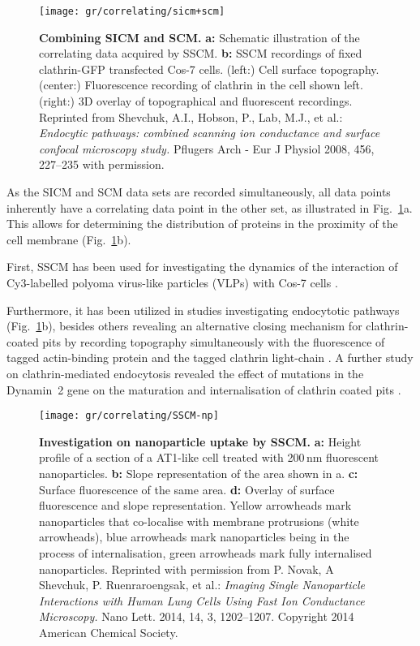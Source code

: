 \begin{figure}
  \texttt{[image: gr/correlating/sicm+scm]}
  \caption{%
    \textbf{Combining SICM and SCM.}
    \textbf{a:} Schematic illustration of the correlating data acquired by SSCM.
    \textbf{b:} SSCM recordings of fixed clathrin-GFP transfected Cos-7 cells. 
    	(left:) Cell surface topography. 
    	(center:) Fluorescence recording of clathrin in the cell shown left. 
    	(right:) 3D overlay of topographical and fluorescent recordings. 
    Reprinted from Shevchuk, A.I., Hobson, P., Lab, M.J., et al.: \emph{Endocytic
    pathways: combined scanning ion conductance and surface confocal
    microscopy study.} Pflugers Arch - Eur J Physiol 2008, 456, 227–235 with permission.
  }
  \label{fig:sicm+scm}
\end{figure}

As the SICM and SCM data sets are recorded simultaneously, all data points
inherently have a correlating data point in the other set, as illustrated in
Fig.~\ref{fig:sicm+scm}a. This allows for determining the distribution of
proteins in the proximity of the cell membrane (Fig.~\ref{fig:sicm+scm}b).



First, SSCM has been used for investigating the dynamics of the interaction of
Cy3-labelled polyoma virus-like particles (VLPs) with Cos-7 cells
\cite{Gorelik2002a}.

Furthermore, it has been utilized in studies investigating endocytotic
pathways \cite{Shevchuk2008a} (Fig.~\ref{fig:sicm+scm}b), besides others
revealing an alternative closing mechanism for clathrin-coated pits by
recording topography simultaneously with the fluorescence of tagged
actin-binding protein and the tagged clathrin light-chain
\cite{Shevchuk2012}. A further study on clathrin-mediated endocytosis revealed
the effect of mutations in the Dynamin~2 gene on the maturation and
internalisation of clathrin coated pits \cite{Ali2019}.

\begin{figure}
  \centering
  \texttt{[image: gr/correlating/SSCM-np]}
  \caption{%
    \textbf{Investigation on nanoparticle uptake by SSCM.}  \textbf{a:} Height
    profile of a section of a AT1-like cell treated with 200\,nm fluorescent
    nanoparticles.  \textbf{b:} Slope representation of the area shown in a.
    \textbf{c:} Surface fluorescence of the same area.  \textbf{d:} Overlay
    of surface fluorescence and slope representation. Yellow arrowheads mark
    nanoparticles that co-localise with membrane protrusions (white
    arrowheads), blue arrowheads mark nanoparticles being in the process of
    internalisation, green arrowheads mark fully internalised nanoparticles.
    Reprinted with permission from P. Novak, A Shevchuk, P. Ruenraroengsak, et
    al.: \emph{Imaging Single Nanoparticle Interactions with Human Lung Cells
      Using Fast Ion Conductance Microscopy.} Nano Lett. 2014, 14, 3,
    1202–1207. Copyright 2014 American Chemical Society.}
  \label{fig:sscm-np}
\end{figure}


